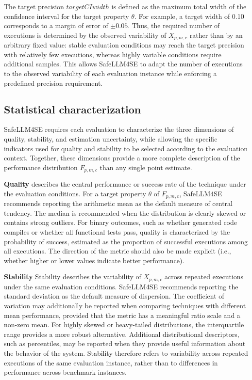 \documentclass{IEEEcsmag}
\begin{document}
The target precision $targetCIwidth$ is defined as the maximum total width of the confidence interval for the target property $\theta$. For example, a target width of 0.10 corresponds to a margin of error of $\pm 0.05$. Thus, the required number of executions is determined by the observed variability of $X_{p,m,c}$ rather than by an arbitrary fixed value: stable evaluation conditions may reach the target precision with relatively few executions, whereas highly variable conditions require additional samples. This allows SafeLLM4SE to adapt the number of executions to the observed variability of each evaluation instance while enforcing a predefined precision requirement.



\subsection{Statistical characterization}
\label{subsection:SafeLLM4SE:characterization}


SafeLLM4SE requires each evaluation to characterize the three dimensions of quality, stability, and estimation uncertainty, while allowing the specific indicators used for quality and stability to be selected according to the evaluation context. Together, these dimensions provide a more complete description of the performance distribution $F_{p,m,c}$ than any single point estimate.

\textbf{Quality} describes the central performance or success rate of the technique under the evaluation conditions. For a target property $\theta$ of $F_{p,m,c}$, SafeLLM4SE recommends reporting the arithmetic mean as the default measure of central tendency. The median is recommended when the distribution is clearly skewed or contains strong outliers. For binary outcomes, such as whether generated code compiles or whether all functional tests pass, quality is characterized by the probability of success, estimated as the proportion of successful executions among all executions. The direction of the metric should also be made explicit (i.e., whether higher or lower values indicate better performance).

\textbf{Stability} Stability describes the variability of $X_{p,m,c}$ across repeated executions under the same evaluation conditions. SafeLLM4SE recommends reporting the standard deviation as the default measure of dispersion. The coefficient of variation may additionally be reported when comparing techniques with different mean performance, provided that the metric has a meaningful ratio scale and a non-zero mean. For highly skewed or heavy-tailed distributions, the interquartile range provides a more robust alternative. Additional distributional descriptors, such as percentiles, may be reported when they provide useful information about the behavior of the system. Stability therefore refers to variability across repeated executions of the same evaluation instance, rather than to differences in performance across benchmark instances.
\end{document}

